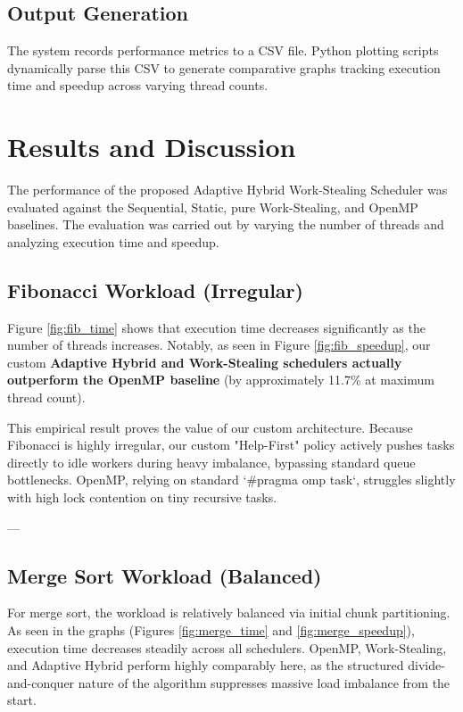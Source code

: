 \documentclass[12pt,a4paper]{article}
\begin{document}
\subsection{Output Generation}

The system records performance metrics to a CSV file. Python plotting scripts dynamically parse this CSV to generate comparative graphs tracking execution time and speedup across varying thread counts.

\section{Results and Discussion}

The performance of the proposed Adaptive Hybrid Work-Stealing Scheduler was evaluated against the Sequential, Static, pure Work-Stealing, and OpenMP baselines. The evaluation was carried out by varying the number of threads and analyzing execution time and speedup.

\subsection{Fibonacci Workload (Irregular)}

Figure \ref{fig:fib_time} shows that execution time decreases significantly as the number of threads increases. Notably, as seen in Figure \ref{fig:fib_speedup}, our custom \textbf{Adaptive Hybrid and Work-Stealing schedulers actually outperform the OpenMP baseline} (by approximately 11.7\% at maximum thread count). 

This empirical result proves the value of our custom architecture. Because Fibonacci is highly irregular, our custom "Help-First" policy actively pushes tasks directly to idle workers during heavy imbalance, bypassing standard queue bottlenecks. OpenMP, relying on standard `\#pragma omp task`, struggles slightly with high lock contention on tiny recursive tasks.

---

\subsection{Merge Sort Workload (Balanced)}

For merge sort, the workload is relatively balanced via initial chunk partitioning. As seen in the graphs (Figures \ref{fig:merge_time} and \ref{fig:merge_speedup}), execution time decreases steadily across all schedulers. OpenMP, Work-Stealing, and Adaptive Hybrid perform highly comparably here, as the structured divide-and-conquer nature of the algorithm suppresses massive load imbalance from the start.
\end{document}
